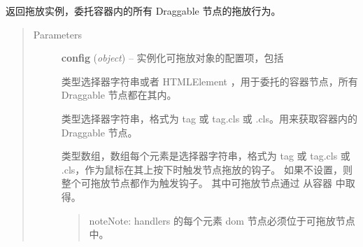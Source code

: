 \documentclass[letterpaper,10pt,english]{sphinxmanual}
\begin{document}
\begin{fulllineitems}
\label{api/component/dd/draggable-delegate:DD.DraggableDelegate}
返回拖放实例，委托容器内的所有 Draggable 节点的拖放行为。
\begin{quote}\begin{description}
\item[{Parameters}] \leavevmode
\textbf{config} (\emph{object}) --
实例化可拖放对象的配置项，包括


\begin{fulllineitems}
\label{api/component/dd/draggable-delegate:DD.DraggableDelegate.config.container}
类型选择器字符串或者 HTMLElement ，用于委托的容器节点，所有 Draggable 节点都在其内。

\end{fulllineitems}



\begin{fulllineitems}
\label{api/component/dd/draggable-delegate:DD.DraggableDelegate.config.selector}
类型选择器字符串，格式为 tag 或 tag.cls 或 .cls。用来获取容器内的 Draggable 节点。

\end{fulllineitems}



\begin{fulllineitems}
\label{api/component/dd/draggable-delegate:DD.DraggableDelegate.config.handlers}
类型数组，数组每个元素是选择器字符串，格式为 tag 或 tag.cls 或 .cls，作为鼠标在其上按下时触发节点拖放的钩子。
如果不设置，则整个可拖放节点都作为触发钩子。
其中可拖放节点通过 {\hyperref[api/component/dd/draggable-delegate:DD.DraggableDelegate.config.selector]{}}
从容器 {\hyperref[api/component/dd/draggable-delegate:DD.DraggableDelegate.config.container]{}} 中取得。
\begin{quote}

\begin{notice}{note}{Note:}
handlers 的每个元素 dom 节点必须位于可拖放节点中。
\end{notice}
\end{quote}

\end{fulllineitems}



\end{description}\end{quote}

\end{fulllineitems}
\end{document}
